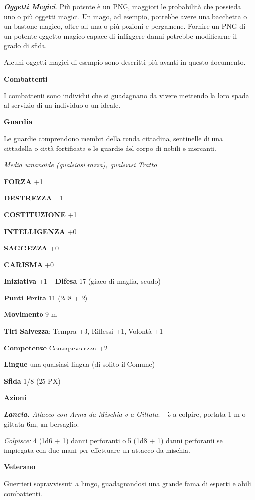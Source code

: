 \begin{multicols}{2}
	\textit{\textbf{Oggetti Magici}}. Più potente è un PNG, maggiori le probabilità che possieda uno o più oggetti magici. Un mago, ad esempio, potrebbe avere una bacchetta o un bastone magico, oltre ad una o più pozioni e pergamene. Fornire un PNG di un potente oggetto magico capace di infliggere danni potrebbe modificarne il grado di sfida.

	Alcuni oggetti magici di esempio sono descritti più avanti in questo documento.

	\textbf{Combattenti}

	I combattenti sono individui che si guadagnano da vivere mettendo la loro spada al servizio di un individuo o un ideale.

	\medskip\textbf{Guardia}

	Le guardie comprendono membri della ronda cittadina, sentinelle di una cittadella o città fortificata e le guardie del corpo di nobili e mercanti.

	\textit{Media umanoide (qualsiasi razza), qualsiasi Tratto}

	\textbf{FORZA} +1

	\textbf{DESTREZZA} +1

	\textbf{COSTITUZIONE} +1

	\textbf{INTELLIGENZA} +0

	\textbf{SAGGEZZA} +0

	\textbf{CARISMA} +0

	\textbf{Iniziativa} +1 -- \textbf{Difesa} 17 (giaco di maglia, scudo)

	\textbf{Punti Ferita} 11 (2d8 + 2)

	\textbf{Movimento} 9 m

	\textbf{Tiri Salvezza}: Tempra +3, Riflessi +1, Volontà +1

	\textbf{Competenze} Consapevolezza +2

	\textbf{Lingue} una qualsiasi lingua (di solito il Comune)

	\textbf{Sfida} 1/8 (25 PX)

	\textbf{Azioni}

	\textit{\textbf{Lancia.} Attacco con Arma da Mischia o a Gittata}: +3 a colpire, portata 1 m o gittata 6m, un bersaglio.

	\textit{Colpisce:} 4 (1d6 + 1) danni perforanti o 5 (1d8 + 1) danni perforanti se impiegata con due mani per effettuare un attacco da mischia.

	\medskip\textbf{Veterano}

	Guerrieri sopravvissuti a lungo, guadagnandosi una grande fama di esperti e abili combattenti.


\end{multicols}
